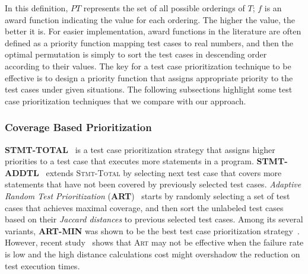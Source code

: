 In this definition, $PT$ represents the set of all possible orderings of $T$; $f$ is an award function indicating the value for each ordering. The higher the value, the better it is. For easier implementation, award functions in the literature are often defined as a priority function mapping test cases to real numbers, and then the optimal permutation is simply to sort the test cases in descending order according to their values. The key for a test case prioritization technique to be effective is to design a priority function that assigns appropriate priority to the test cases under given situations.
The following subsections highlight some test case prioritization techniques that we compare with our approach.

\subsubsection{Coverage Based Prioritization}

\textbf{\textsc{S{\scriptsize TMT}-T{\scriptsize OTAL}}}~\citep{RUCH01} is a test case prioritization strategy that assigns higher priorities to
a test case that executes more statements in a program.
\textbf{S{\scriptsize TMT}-A{\scriptsize DDTL}}~\citep{RUCH01} extends \textsc{Stmt-Total} by selecting next test case that covers more statements
that have not been covered by previously selected test cases.
{\em Adaptive Random Test Prioritization} ({\bf A{\scriptsize RT}})~\citep{JiangZCT09} starts by randomly selecting a set of test cases
that achieves maximal coverage, and then sort the unlabeled test cases based on their {\em Jaccard distances} to previous selected test cases.
Among its several variants, {\bf A{\scriptsize RT}-M{\scriptsize IN}} was shown to be the best test case prioritization strategy~\citep{JiangZCT09}.
However, recent study~\citep{DBLP:conf/issta/ArcuriB11} shows that \textsc{Art} may not be effective when the failure rate is low and the high distance calculations cost might overshadow the reduction on test execution times.

